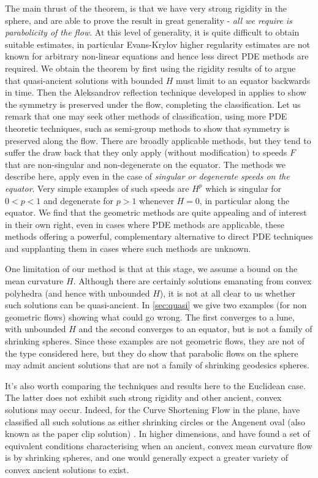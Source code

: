 \documentclass{amsart}
\begin{document}
The main thrust of the theorem, is that we have very strong rigidity in the sphere, and are able to prove the result in great generality - \emph{all we require is parabolicity of the flow}. At this level of generality, it is quite difficult to obtain suitable estimates, in particular Evans-Krylov higher regularity estimates are not known for arbitrary non-linear equations and hence less direct PDE methods are required. We obtain the theorem by first using the rigidity results of \cite{MakowskiScheuer:/2013} to argue that quasi-ancient solutions with bounded \(H\) must limit to an equator backwards in time. Then the Aleksandrov reflection technique developed in \cite{bryanlouie,2015arXiv150802821B} applies to show the symmetry is preserved under the flow, completing the classification. Let us remark that one may seek other methods of classification, using more PDE theoretic techniques, such as semi-group methods to show that symmetry is preserved along the flow. There are broadly applicable methods, but they tend to suffer the draw back that they only apply (without modification) to speeds \(F\) that are non-singular and non-degenerate on the equator. The methods we describe here, apply even in the case of \emph{singular or degenerate speeds on the equator}. Very simple examples of such speeds are \(H^p\) which is singular for \(0 < p < 1\) and degenerate for \(p > 1\) whenever \(H = 0\), in particular along the equator. We find that the geometric methods are quite appealing and of interest in their own right, even in cases where PDE methods are applicable, these methods offering a powerful, complementary alternative to direct PDE techniques and supplanting them in cases where such methods are unknown.

One limitation of our method is that at this stage, we assume a bound on the mean curvature \(H\). Although there are certainly solutions emanating from convex polyhedra (and hence with unbounded \(H\)), it is not at all clear to us whether such solutions can be quasi-ancient. In \cref{sec:quasi} we give two examples (for non geometric flows) showing what could go wrong. The first converges to a lune, with unbounded \(H\) and the second converges to an equator, but is not a family of shrinking spheres. Since these examples are not geometric flows, they are not of the type considered here, but they do show that parabolic flows on the sphere may admit ancient solutions that are not a family of shrinking geodesics spheres.

It's also worth comparing the techniques and results here to the Euclidean case. The latter does not exhibit such strong rigidity and other ancient, convex solutions may occur. Indeed, for the Curve Shortening Flow in the plane, \cite{DaskalopoulosHamiltonSesum:2010} have classified all such solutions as either shrinking circles or the Angenent oval (also known as the paper clip solution) \cite{Angenent:1992}. In higher dimensions, \cite{HuiskenSinestrari:05/2014} and \cite{HaslhoferHershkovits:08/2013} have found a set of equivalent conditions characterising when an ancient, convex mean curvature flow is by shrinking spheres, and one would generally expect a greater variety of convex ancient solutions to exist.
\end{document}
